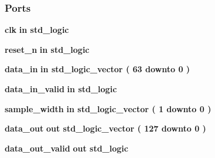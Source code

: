 \subsubsection*{Ports}
 \begin{DoxyCompactItemize}
\item 
{\bf clk}  {\bfseries {\bfseries \textcolor{keywordflow}{in}\textcolor{vhdlchar}{ }}} {\bfseries \textcolor{comment}{std\+\_\+logic}\textcolor{vhdlchar}{ }} 
\item 
{\bf reset\+\_\+n}  {\bfseries {\bfseries \textcolor{keywordflow}{in}\textcolor{vhdlchar}{ }}} {\bfseries \textcolor{comment}{std\+\_\+logic}\textcolor{vhdlchar}{ }} 
\item 
{\bf data\+\_\+in}  {\bfseries {\bfseries \textcolor{keywordflow}{in}\textcolor{vhdlchar}{ }}} {\bfseries \textcolor{comment}{std\+\_\+logic\+\_\+vector}\textcolor{vhdlchar}{ }\textcolor{vhdlchar}{(}\textcolor{vhdlchar}{ }\textcolor{vhdlchar}{ } \textcolor{vhdldigit}{63} \textcolor{vhdlchar}{ }\textcolor{keywordflow}{downto}\textcolor{vhdlchar}{ }\textcolor{vhdlchar}{ } \textcolor{vhdldigit}{0} \textcolor{vhdlchar}{ }\textcolor{vhdlchar}{)}\textcolor{vhdlchar}{ }} 
\item 
{\bf data\+\_\+in\+\_\+valid}  {\bfseries {\bfseries \textcolor{keywordflow}{in}\textcolor{vhdlchar}{ }}} {\bfseries \textcolor{comment}{std\+\_\+logic}\textcolor{vhdlchar}{ }} 
\item 
{\bf sample\+\_\+width}  {\bfseries {\bfseries \textcolor{keywordflow}{in}\textcolor{vhdlchar}{ }}} {\bfseries \textcolor{comment}{std\+\_\+logic\+\_\+vector}\textcolor{vhdlchar}{ }\textcolor{vhdlchar}{(}\textcolor{vhdlchar}{ }\textcolor{vhdlchar}{ } \textcolor{vhdldigit}{1} \textcolor{vhdlchar}{ }\textcolor{keywordflow}{downto}\textcolor{vhdlchar}{ }\textcolor{vhdlchar}{ } \textcolor{vhdldigit}{0} \textcolor{vhdlchar}{ }\textcolor{vhdlchar}{)}\textcolor{vhdlchar}{ }} 
\item 
{\bf data\+\_\+out}  {\bfseries {\bfseries \textcolor{keywordflow}{out}\textcolor{vhdlchar}{ }}} {\bfseries \textcolor{comment}{std\+\_\+logic\+\_\+vector}\textcolor{vhdlchar}{ }\textcolor{vhdlchar}{(}\textcolor{vhdlchar}{ }\textcolor{vhdlchar}{ } \textcolor{vhdldigit}{127} \textcolor{vhdlchar}{ }\textcolor{keywordflow}{downto}\textcolor{vhdlchar}{ }\textcolor{vhdlchar}{ } \textcolor{vhdldigit}{0} \textcolor{vhdlchar}{ }\textcolor{vhdlchar}{)}\textcolor{vhdlchar}{ }} 
\item 
{\bf data\+\_\+out\+\_\+valid}  {\bfseries {\bfseries \textcolor{keywordflow}{out}\textcolor{vhdlchar}{ }}} {\bfseries \textcolor{comment}{std\+\_\+logic}\textcolor{vhdlchar}{ }} 
\end{DoxyCompactItemize}


